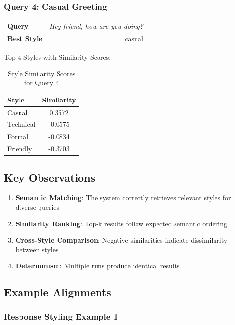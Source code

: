 \documentclass[11pt,a4paper]{article}
\begin{document}
\subsubsection{Query 4: Casual Greeting}

\begin{table}[H]
\centering
\begin{tabular}{|l|r|}
\toprule
\textbf{Query} & \textit{Hey friend, how are you doing?} \\
\textbf{Best Style} & casual \\
\bottomrule
\end{tabular}
\end{table}

Top-4 Styles with Similarity Scores:
\begin{table}[H]
\centering
\begin{tabular}{|l|c|}
\toprule
\textbf{Style} & \textbf{Similarity} \\
\midrule
Casual & 0.3572 \\
Technical & -0.0575 \\
Formal & -0.0834 \\
Friendly & -0.3703 \\
\bottomrule
\end{tabular}
\caption{Style Similarity Scores for Query 4}
\end{table}

\subsection{Key Observations}

\begin{enumerate}
    \item \textbf{Semantic Matching}: The system correctly retrieves relevant styles for diverse queries
    \item \textbf{Similarity Ranking}: Top-k results follow expected semantic ordering
    \item \textbf{Cross-Style Comparison}: Negative similarities indicate dissimilarity between styles
    \item \textbf{Determinism}: Multiple runs produce identical results
\end{enumerate}

\subsection{Example Alignments}

\subsubsection{Response Styling Example 1}
\end{document}
